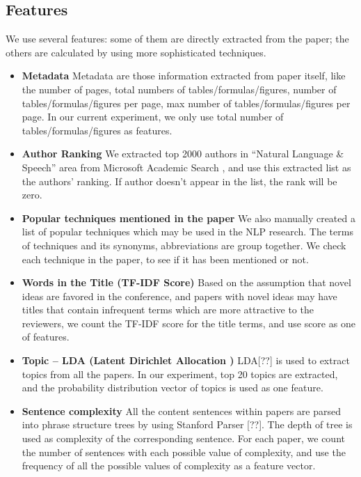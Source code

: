 \documentclass[11pt,letterpaper]{article}
\begin{document}
\subsection{Features}
We use several features: some of them are directly extracted from the paper; 
the others are calculated by using more sophisticated techniques.

\begin{itemize} 
\item {\bf Metadata}
Metadata are those information extracted from paper itself, like the number of pages, total numbers of tables/formulas/figures, number of tables/formulas/figures per page, max number of tables/formulas/figures per page. In our current experiment, we only use total number of tables/formulas/figures as features.

\item {\bf 	Author Ranking}
We extracted top 2000 authors in ``Natural Language \& Speech'' area from Microsoft Academic Search , and use this extracted list as the authors’ ranking. If author doesn’t appear in the list, the rank will be zero.

\item {\bf 	Popular techniques mentioned in the paper}
We also manually created a list of popular techniques which may be used in the NLP research. The terms of techniques and its synonyms, abbreviations are group together. We check each technique in the paper, to see if it has been mentioned or not.

\item {\bf Words in the Title (TF-IDF Score)}
Based on the assumption that novel ideas are favored in the conference, and papers with novel ideas may have titles that contain infrequent terms which are more attractive to the reviewers, we count the TF-IDF score for the title terms, and use score as one of features.

\item {\bf Topic – LDA (Latent Dirichlet Allocation )}
LDA[??] is used to extract topics from all the papers. In our experiment, top 20 topics are extracted, and the probability distribution vector of topics is used as one feature. 

\item {\bf 	Sentence complexity}
All the content sentences within papers are parsed into phrase structure trees by using Stanford Parser [??]. The depth of tree is used as complexity of the corresponding sentence.  
For each paper, we count the number of sentences with each possible value of complexity,
and use the frequency of all the possible values of complexity as a feature vector.
\end{itemize}
\end{document}
